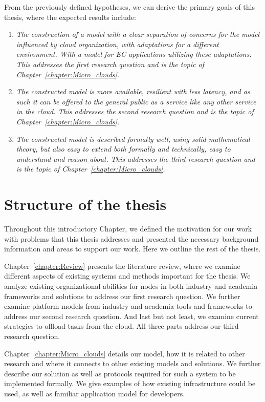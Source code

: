 \noindent
From the previously defined hypotheses, we can derive the primary goals of this thesis, where the expected results include:

\begin{enumerate}[start=1,label={(\bfseries \arabic*)}]
	\item \textit{The construction of a model with a clear separation of concerns for the model influenced by cloud organization, with adaptations for a different environment. With a model for EC applications utilizing these adaptations. This addresses the first research question and is the topic of Chapter~\ref{chapter:Micro_clouds}.}
	\item \textit{The constructed model is more available, resilient with less latency, and as such it can be offered to the general public as a service like any other service in the cloud. This addresses the second research question and is the topic of Chapter~\ref{chapter:Micro_clouds}.}
	\item \textit{The constructed model is described formally well, using solid mathematical theory, but also easy to extend both formally and technically, easy to understand and reason about. This addresses the third research question and is the topic of Chapter~\ref{chapter:Micro_clouds}.}
\end{enumerate}
%
%
\section{Structure of the thesis}\label{sec:structure_of_thesis}
%
Throughout this introductory Chapter, we defined the motivation for our work with problems that this thesis addresses and presented the necessary background information and areas to support our work. Here we outline the rest of the thesis.

Chapter~\ref{chapter:Review} presents the literature review, where we examine different aspects of existing systems and methods important for the thesis. We analyze existing organizational abilities for nodes in both industry and academia frameworks and solutions to address our first research question. We further examine platform models from industry and academia tools and frameworks to address our second research question. And last but not least, we examine current strategies to offload tasks from the cloud. All three parts address our third research question.

Chapter~\ref{chapter:Micro_clouds} details our model, how it is related to other research and where it connects to other existing models and solutions. We further describe our solution as well as protocols required for such a system to be implemented formally. We give examples of how existing infrastructure could be used, as well as familiar application model for developers. 

